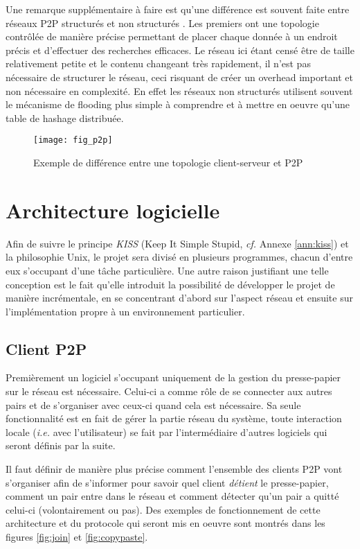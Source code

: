 Une remarque supplémentaire à faire est qu'une différence est souvent faite
entre réseaux P2P structurés et non structurés \cite{AS04, Lua05asurvey}.
Les premiers ont une topologie contrôlée de manière précise permettant
de placer chaque donnée à un endroit précis et d'effectuer des recherches
efficaces. Le réseau ici étant censé être de taille relativement petite
et le contenu changeant très rapidement, il n'est pas nécessaire de structurer
le réseau, ceci risquant de créer un overhead important et non nécessaire en
complexité. En effet les réseaux non structurés utilisent souvent le
mécanisme de flooding plus simple à comprendre et à mettre en oeuvre qu'une
table de hashage distribuée.

\begin{figure}[!h]
  \centering
  \texttt{[image: fig\_p2p]}
  \caption{Exemple de différence entre une topologie client-serveur et P2P}
  \label{fig:p2p}
\end{figure}

\section{Architecture logicielle}
Afin de suivre le principe \emph{KISS} (Keep It Simple Stupid, \emph{cf.}
Annexe \ref{ann:kiss}) et la philosophie Unix, le projet sera divisé en
plusieurs programmes, chacun d'entre eux s'occupant d'une tâche particulière.
Une autre raison justifiant une telle conception est le fait qu'elle introduit
la possibilité de développer le projet de manière incrémentale, en se
concentrant d'abord sur l'aspect réseau et ensuite sur l'implémentation
propre à un environnement particulier.

\subsection{Client P2P}
Premièrement un logiciel s'occupant uniquement de la gestion du presse-papier
sur le réseau est nécessaire. Celui-ci a comme rôle de se connecter aux
autres pairs et de s'organiser avec ceux-ci quand cela est nécessaire.
Sa seule fonctionnalité est en fait de gérer la partie réseau du système,
toute interaction locale (\emph{i.e.} avec l'utilisateur) se fait par
l'intermédiaire d'autres logiciels qui seront définis par la suite.

Il faut définir de manière plus précise comment l'ensemble des clients P2P
vont s'organiser afin de s'informer pour savoir quel client \emph{détient} le
presse-papier, comment un pair entre dans le réseau et comment détecter
qu'un pair a quitté celui-ci (volontairement ou pas). Des exemples
de fonctionnement de cette architecture et du protocole qui seront mis en
oeuvre sont montrés dans les figures \ref{fig:join} et \ref{fig:copypaste}.

